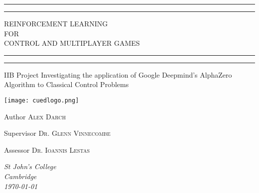 \documentclass[12pt]{report}
\date{\today}
\begin{document}
\begin{titlepage} %

	\centering %
	\scshape %
	\vspace*{\baselineskip} %
	\rule{\textwidth}{1.6pt}\vspace*{-\baselineskip}\vspace*{2pt} %
	\rule{\textwidth}{0.4pt} %
	\vspace{0.75\baselineskip} %
	
	{\LARGE REINFORCEMENT LEARNING \\ FOR \\ CONTROL AND MULTIPLAYER GAMES \\} %
	
	\vspace{0.75\baselineskip} %
	\rule{\textwidth}{0.4pt}\vspace*{-\baselineskip}\vspace{3.2pt} %
	\rule{\textwidth}{1.6pt} %
	\vspace{1\baselineskip} %
	
	
	IIB Project Investigating the application of Google Deepmind's AlphaZero Algorithm to Classical Control Problems 
	
    \vspace*{4\baselineskip} %
    \texttt{[image: cuedlogo.png]}
    \vspace*{3\baselineskip} %
	
	
	Author
	\vspace{0.5\baselineskip} %
    {\scshape\Large Alex Darch} %

    Supervisor
	\vspace{0.5\baselineskip} %
    {\scshape\Large Dr. Glenn Vinnecombe} %
    
    Assessor
	\vspace{0.5\baselineskip} %
	{\scshape\Large Dr. Ioannis Lestas} %
    	
	\vfill %
	\vspace{0.3\baselineskip} %
    \textit{St John's College \\ Cambridge \\ \today}

\end{titlepage}
\end{document}
